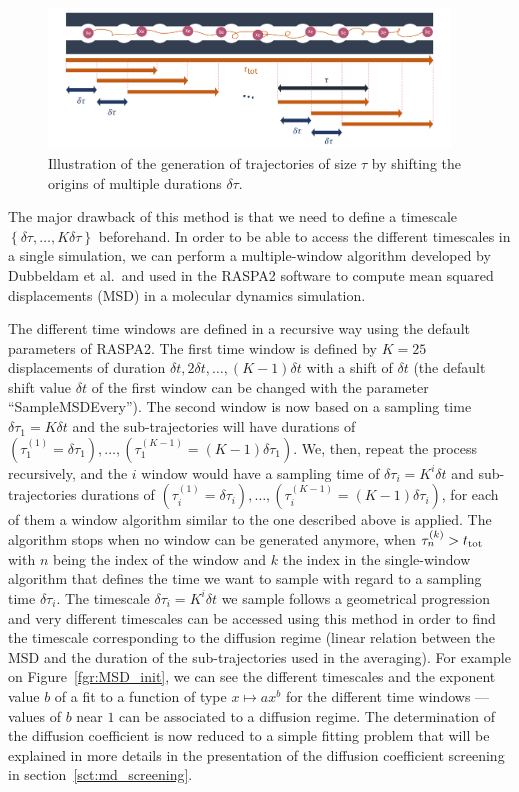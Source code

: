 \documentclass[main]{subfiles}
\begin{document}
\begin{figure}[ht]
  \centering
    \includegraphics[width=0.95\textwidth]{figures/5-diffusion/diffusion_averaging.pdf}
    \caption{Illustration of the generation of trajectories of size $\tau$ by shifting the origins of multiple durations $\delta\tau$. }\label{fgr:window_msd}
\end{figure}

The major drawback of this method is that we need to define a timescale $\left\{\delta\tau, \ldots, K\delta\tau\right\}$ beforehand. In order to be able to access the different timescales in a single simulation, we can perform a multiple-window algorithm developed by Dubbeldam et al.\ and used in the RASPA2 software to compute mean squared displacements (MSD) in a molecular dynamics simulation.

The different time windows are defined in a recursive way using the default parameters of RASPA2. The first time window is defined by $K=25$ displacements of duration $\delta t, 2\delta t, \ldots,(K-1)\delta t$ with a shift of $\delta t$ (the default shift value $\delta t$ of the first window can be changed with the parameter ``SampleMSDEvery''). The second window is now based on a sampling time $\delta \tau_1 = K\delta t$ and the sub-trajectories will have durations of $\left(\tau_1^{(1)} = \delta\tau_1\right),\ldots,\left(\tau_1^{(K-1)} = (K-1)\delta\tau_1\right)$. We, then, repeat the process recursively, and the $i$ window would have a sampling time of $\delta \tau_i = K^i\delta t$ and sub-trajectories durations of $\left(\tau_i^{(1)} = \delta\tau_i\right),\ldots,\left(\tau_i^{(K-1)} = (K-1)\delta\tau_i\right)$, for each of them a window algorithm similar to the one described above is applied. The algorithm stops when no window can be generated anymore, when $\tau_n^{(k)}>t_{\text{tot}}$ with $n$ being the index of the window and $k$ the index in the single-window algorithm that defines the time we want to sample with regard to a sampling time $\delta\tau_i$. The timescale $\delta \tau_i = K^i\delta t$ we sample follows a geometrical progression and very different timescales can be accessed using this method in order to find the timescale corresponding to the diffusion regime (linear relation between the MSD and the duration of the sub-trajectories used in the averaging). For example on Figure~\ref{fgr:MSD_init}, we can see the different timescales and the exponent value $b$ of a fit to a function of type $x \mapsto ax^b$ for the different time windows --- values of $b$ near $1$ can be associated to a diffusion regime. The determination of the diffusion coefficient is now reduced to a simple fitting problem that will be explained in more details in the presentation of the diffusion coefficient screening in section~\ref{sct:md_screening}.
\end{document}
